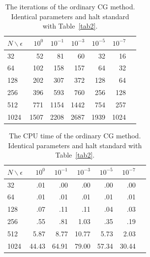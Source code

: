 \documentclass{article}
\begin{document}
\begin{table}[t]
\caption{The iterations of the ordinary CG method. Identical parameters and halt standard with Table~\ref{tab2}. }
\label{tab5}
\vskip 0.15in
\begin{center}
\begin{small}
\begin{sc}
\begin{tabular}{lrrrrrr}
\toprule
$N\backslash\epsilon$ & $10^0$ & $10^{-1}$ & $10^{-3}$ & $10^{-5}$ & $10^{-7}$ \\
\midrule
32 & 52 & 81 & 60 & 32 & 16 \\
64 & 102 & 158 & 157 & 64 & 32 \\
128 & 202 & 307 & 372 & 128 & 64 \\
256 & 396 & 593 & 760 & 256 & 128\\
512 & 771 & 1154 & 1442 & 754 & 257 \\
1024 & 1507 & 2208 & 2687 & 1939 & 1024 \\
\bottomrule
\end{tabular}
\end{sc}
\end{small}
\end{center}
\vskip -0.1in
\end{table}

\begin{table}[t]
\caption{The CPU time of the ordinary CG method. Identical parameters and halt standard with Table~\ref{tab2}. }
\label{tab6}
\vskip 0.15in
\begin{center}
\begin{small}
\begin{sc}
\begin{tabular}{lrrrrrr}
\toprule
$N\backslash\epsilon$ & $10^0$ & $10^{-1}$ & $10^{-3}$ & $10^{-5}$ & $10^{-7}$ \\
\midrule
32 & .01 & .00 & .00 & .00 & .00 \\
64 & .01 & .01 & .01 & .01 & .01 \\
128 & .07 & .11 & .11 & .04 & .03 \\
256 & .55 & .81 & 1.03 & .35 & .19\\
512 & 5.87 & 8.77 & 10.77 & 5.73 & 2.03 \\
1024 & 44.43 & 64.91 & 79.00 & 57.34 & 30.44 \\
\bottomrule
\end{tabular}
\end{sc}
\end{small}
\end{center}
\vskip -0.1in
\end{table}
\end{document}
